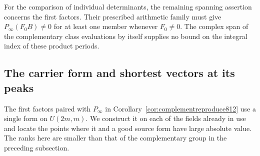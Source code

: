 \documentclass[a4paper,11pt]{article}
\theoremstyle{definition}
\theoremstyle{remark}
\numberwithin{equation}{section}
\begin{document}
For the comparison of individual determinants, the remaining
spanning assertion concerns the first factors. Their prescribed
arithmetic family must give \(P_\infty(F_0B)\ne0\) for at least
one member whenever \(F_0\ne0\). The complex span of the
complementary class evaluations by itself supplies no bound
on the integral index of these product periods.
\clearpage

\subsection{The carrier form and shortest vectors at its peaks}
\label{sec:carrierpeaks813}
The first factors paired with \(P_\infty\) in
Corollary~\ref{cor:complementreproduce812} use a single form on
\(U(2m,m)\). We construct it on each of the fields already in
use and locate the points where it and a good source form
have large absolute value. The ranks here are smaller than
that of the complementary group in the preceding subsection.
\end{document}
